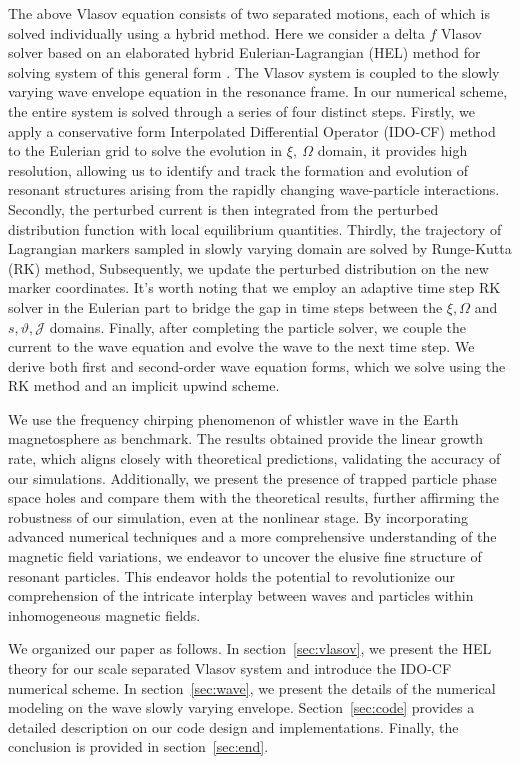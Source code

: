 The above Vlasov equation consists of two separated motions, each of which is solved individually using a hybrid method.
Here we consider a delta $f$ Vlasov solver based on an elaborated hybrid Eulerian-Lagrangian (HEL) method for solving system of this general form \cite{shiroto2022}.
The Vlasov system is coupled to the slowly varying wave envelope equation in the resonance frame. 
In our numerical scheme, the entire system is solved through a series of four distinct steps.
Firstly, we apply a conservative form Interpolated Differential Operator (IDO-CF)  method to the Eulerian grid to solve the evolution in $\xi,~\Omega$ domain, it provides high resolution, allowing us to identify and track the formation and evolution of resonant structures arising from the rapidly changing wave-particle interactions.
Secondly, the perturbed current is then integrated from the perturbed distribution function with local equilibrium quantities.
Thirdly, the trajectory of Lagrangian markers sampled in slowly varying domain are solved by Runge-Kutta (RK) method, 
Subsequently, we update the perturbed distribution on the new marker coordinates. It's worth noting that we employ an adaptive time step RK solver in the Eulerian part to bridge the gap in time steps between the $\xi, \Omega$ and $s, \vartheta, \mathcal{J}$ domains.
Finally, after completing the particle solver, we couple the current to the wave equation and evolve the wave to the next time step.
We derive both first and second-order wave equation forms, which we solve using the RK method and an implicit upwind scheme.

We use the frequency chirping phenomenon of whistler wave in the Earth magnetosphere as benchmark.
The results obtained provide the linear growth rate, which aligns closely with theoretical predictions, validating the accuracy of our simulations.
Additionally, we present the presence of trapped particle phase space holes and compare them with the theoretical results, further affirming the robustness of our simulation, even at the nonlinear stage.
By incorporating advanced numerical techniques and a more comprehensive understanding of the magnetic field variations, we endeavor to uncover the elusive fine structure of resonant particles. This endeavor holds the potential to revolutionize our comprehension of the intricate interplay between waves and particles within inhomogeneous magnetic fields.

We organized our paper as follows. In section~\ref{sec:vlasov}, we present the HEL theory for our scale separated Vlasov system and introduce the IDO-CF numerical scheme. In section~\ref{sec:wave}, we present the details of the numerical modeling on the wave slowly varying envelope. Section~\ref{sec:code} provides a detailed description on our code design and implementations. Finally, the conclusion is provided in section~\ref{sec:end}.

